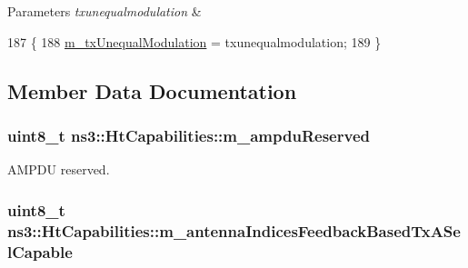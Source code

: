 \begin{DoxyParams}{Parameters}
{\em txunequalmodulation} & \\
\hline
\end{DoxyParams}

\begin{DoxyCode}
187 \{
188   \hyperlink{classns3_1_1HtCapabilities_a867b8deccdd5103df2f88fd019ea1876}{m\_txUnequalModulation} = txunequalmodulation;
189 \}
\end{DoxyCode}


\subsection{Member Data Documentation}
\subsubsection[{\texorpdfstring{m\+\_\+ampdu\+Reserved}{m_ampduReserved}}]{\setlength{\rightskip}{0pt plus 5cm}uint8\+\_\+t ns3\+::\+Ht\+Capabilities\+::m\+\_\+ampdu\+Reserved\hspace{0.3cm}{\ttfamily [private]}}\hypertarget{classns3_1_1HtCapabilities_ac525372deeb111d7fd8d0c1081cee493}{}\label{classns3_1_1HtCapabilities_ac525372deeb111d7fd8d0c1081cee493}


A\+M\+P\+DU reserved. 

\subsubsection[{\texorpdfstring{m\+\_\+antenna\+Indices\+Feedback\+Based\+Tx\+A\+Sel\+Capable}{m_antennaIndicesFeedbackBasedTxASelCapable}}]{\setlength{\rightskip}{0pt plus 5cm}uint8\+\_\+t ns3\+::\+Ht\+Capabilities\+::m\+\_\+antenna\+Indices\+Feedback\+Based\+Tx\+A\+Sel\+Capable\hspace{0.3cm}{\ttfamily [private]}}\hypertarget{classns3_1_1HtCapabilities_a9fa856caa8eb4f176911a6ee63794812}{}\label{classns3_1_1HtCapabilities_a9fa856caa8eb4f176911a6ee63794812}


